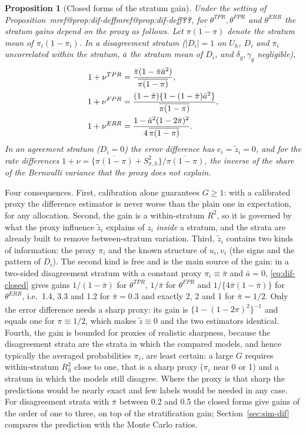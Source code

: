 \documentclass[pdflatex,sn-mathphys-num,iicol]{sn-jnl}
\makeatletter
\theoremstyle{thmstyleone}
\newtheorem{proposition}{Proposition}
\theoremstyle{thmstyletwo}
\theoremstyle{thmstylethree}
\newcommand{\Mref}[1]{\ifcsname mref@#1\endcsname\csname mref@#1\endcsname\else\textbf{??}\fi}
\makeatother
\begin{document}
\begin{proposition}[Closed forms of the stratum gain]\label{prop:dif-closed}
Under the setting of Proposition~\Mref{prop:dif-deff}, for $\theta^{TPR},\theta^{FPR}$ and $\theta^{ERR}$ the stratum gains depend on the proxy as follows. Let $\overline{\pi(1-\pi)}$ denote
the stratum mean of $\pi_i(1-\pi_i)$. In a \emph{disagreement stratum} ($|D_i|=1$ on $U_h$, $D_i$ and $\pi_i$ uncorrelated within the stratum,
$\bar a$ the stratum mean of $D_i$, and $\delta_g,\gamma_g$ negligible),
\begin{align}
1+\nu^{TPR}&=\frac{\bar\pi(1-\bar\pi\bar a^2)}{\overline{\pi(1-\pi)}},\notag\\
1+\nu^{FPR}&=\frac{(1-\bar\pi)\{1-(1-\bar\pi)\bar a^2\}}{\overline{\pi(1-\pi)}},\notag\\
1+\nu^{ERR}&=\frac{1-\bar a^2(1-2\bar\pi)^2}{4\,\overline{\pi(1-\pi)}} .\label{eq:dif-closed}
\end{align}
In an \emph{agreement stratum} ($D_i=0$) the error difference has $e_i=\tilde z_i=0$, and for the rate differences
$1+\nu=\{\overline{\pi(1-\pi)}+S^2_{\pi,h}\}/\overline{\pi(1-\pi)}$, the inverse of the share of the Bernoulli variance that the proxy does \emph{not} explain.
\end{proposition}

Four consequences. First, calibration alone guarantees $G\ge1$: with a calibrated proxy the difference estimator is never worse than the plain one in
expectation, for any allocation. Second, the gain is a within-stratum $R^2$, so it is governed by what the proxy influence $\tilde z_i$ explains of $z_i$
\emph{inside} a stratum, and the strata are already built to remove between-stratum variation. Third, $\tilde z_i$ contains two kinds of
information: the proxy $\pi_i$ and the known structure of $u_i,v_i$ (the signs and the pattern of $D_i$). The second kind is free and
is the main source of the gain: in a two-sided disagreement stratum with a constant proxy $\pi_i\equiv\bar\pi$ and $\bar a=0$,
\eqref{eq:dif-closed} gives gains $1/(1-\bar\pi)$ for $\theta^{TPR}$, $1/\bar\pi$ for $\theta^{FPR}$ and $1/\{4\bar\pi(1-\bar\pi)\}$ for $\theta^{ERR}$, i.e.\ 1.4,
3.3 and 1.2 for $\bar\pi=0.3$ and exactly 2, 2 and 1 for $\bar\pi=1/2$. Only the error difference needs a sharp proxy: its gain is
$\{1-\overline{(1-2\pi)^2}\}^{-1}$ and equals one for $\pi\equiv1/2$, which makes $\tilde z\equiv0$ and the two estimators identical. Fourth, the
gain is bounded for proxies of realistic sharpness, because the disagreement strata are the strata in which the compared models, and hence typically the
averaged probabilities $\pi_i$, are least certain: a large $G$ requires within-stratum $R_h^2$ close to one, that is a sharp proxy
($\pi_i$ near 0 or 1) and a stratum in which the models still disagree. Where the proxy is that sharp the predictions would be nearly
exact and few labels would be needed in any case. For disagreement strata with $\bar\pi$ between 0.2 and 0.5 the closed forms give gains of the order of one to three, on top of the
stratification gain; Section~\ref{sec:sim-dif} compares the prediction with the Monte Carlo ratios.
\end{document}
